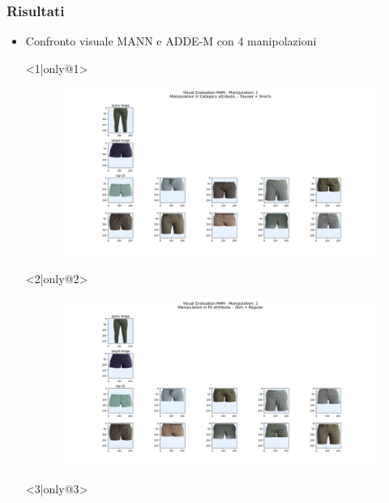 \documentclass{beamer}
\begin{document}
\begin{frame}
\frametitle{Risultati}
\begin{itemize} 
\item Confronto visuale MANN e ADDE-M con $4$ manipolazioni
\item[] <1|only@1> 
\hspace{-20px}
\begin{figure}[!h]
 			\begin{center}
 			\hspace{-80px}
 			\includegraphics[scale=0.28]{"Immagini/4.1.png"}
 			\end{center}
\end{figure}
\item[] <2|only@2>
\hspace{-20px}
\begin{figure}[!h]
 			\begin{center}
 			\hspace{-80px}
 			\includegraphics[scale=0.28]{"Immagini/4.2.png"}
 			\end{center}
\end{figure}
\item[] <3|only@3> 
\hspace{-20px}
\begin{figure}[!h]

\end{figure}
\end{itemize}
\end{frame}
\end{document}
